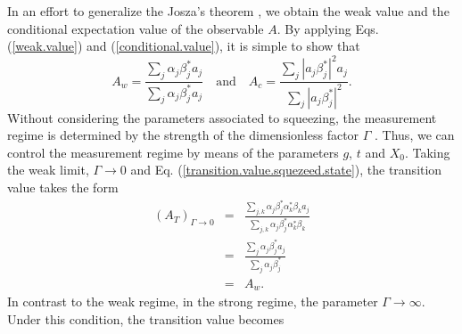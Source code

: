 \documentclass[aps,pra,preprint,superscriptaddress, showpacs]{revtex4-2}
\begin{document}
In an effort to generalize the Josza's theorem \cite{jozsa2007complex}, we obtain the weak value and the conditional expectation value of the observable $A$. By applying Eqs. (\ref{weak.value}) and (\ref{conditional.value}), it is simple to show that
\begin{equation}\label{weak.and.strong.value}
A_{w}=\frac{\sum_{j}\alpha_{j}\beta_{j}^{*}a_{j}}{\sum_{j}\alpha_{j}\beta_{j}^{*}a_{j}} \quad \text{and} \quad A_{c}=\frac{\sum_{j} |a_{j}\beta_{j}^{*}|^{2} a_{j}}{\sum_{j} |a_{j}\beta_{j}^{*}|^{2}}.
\end{equation}
Without considering the parameters associated to squeezing, the measurement regime is determined by the strength of the dimensionless factor $\Gamma$ \cite{pan2020weak}. Thus, we can control the measurement regime by means of the parameters $g$, $t$ and $X_{0}$. Taking the weak limit, $\Gamma\rightarrow 0$ and Eq. (\ref{transition.value.squezeed.state}), the transition value takes the form 
\begin{eqnarray}
(A_{T})_{\Gamma \rightarrow 0}&=&\frac{\sum_{j, k}\alpha_{j}\beta_{j}^{*}\alpha_{k}^{*}\beta_{k}a_{j}}{\sum_{j, k}\alpha_{j}\beta_{j}^{*}\alpha_{k}^{*}\beta_{k}}\nonumber \\
&=&\frac{\sum_{j}\alpha_{j}\beta_{j}^{*}a_{j}}{\sum_{j}\alpha_{j}\beta_{j}^{*}}\nonumber \\
&=&A_{w}.
\end{eqnarray}
In contrast to the weak regime, in the strong regime, the parameter $\Gamma \rightarrow \infty$. Under this condition, the transition value becomes
\end{document}
